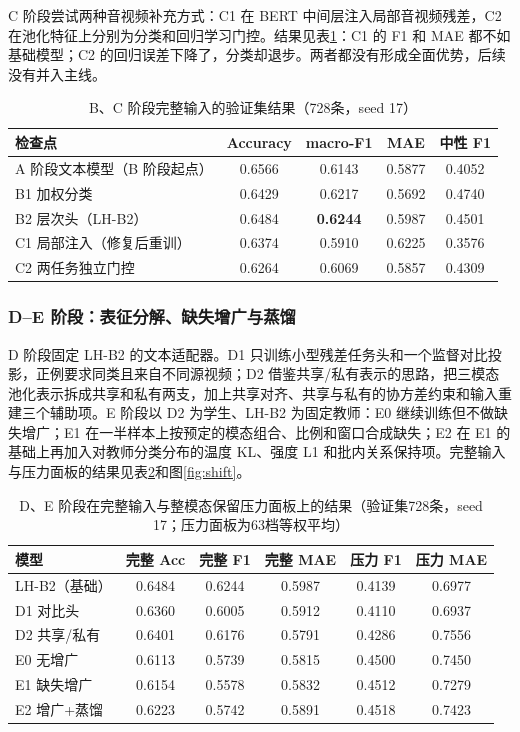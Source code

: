 C 阶段尝试两种音视频补充方式：C1 在 BERT 中间层注入局部音视频残差，C2 在池化特征上分别为分类和回归学习门控。结果见表\ref{tab:stageBC}：C1 的 F1 和 MAE 都不如基础模型；C2 的回归误差下降了，分类却退步。两者都没有形成全面优势，后续没有并入主线。

\begin{table}[htbp]
\centering
\caption{B、C 阶段完整输入的验证集结果（728条，seed 17）}
\label{tab:stageBC}
\begin{tabular}{lcccc}
\toprule
检查点 & Accuracy & macro-F1 & MAE & 中性 F1 \\
\midrule
A 阶段文本模型（B 阶段起点） & 0.6566 & 0.6143 & 0.5877 & 0.4052 \\
B1 加权分类 & 0.6429 & 0.6217 & 0.5692 & 0.4740 \\
B2 层次头（LH-B2） & 0.6484 & \textbf{0.6244} & 0.5987 & 0.4501 \\
C1 局部注入（修复后重训） & 0.6374 & 0.5910 & 0.6225 & 0.3576 \\
C2 两任务独立门控 & 0.6264 & 0.6069 & 0.5857 & 0.4309 \\
\bottomrule
\end{tabular}
\end{table}

\subsubsection{D–E 阶段：表征分解、缺失增广与蒸馏}

D 阶段固定 LH-B2 的文本适配器。D1 只训练小型残差任务头和一个监督对比投影\cite{khosla2020supcon}，正例要求同类且来自不同源视频；D2 借鉴共享/私有表示的思路\cite{hazarika2020misa}，把三模态池化表示拆成共享和私有两支，加上共享对齐、共享与私有的协方差约束和输入重建三个辅助项。E 阶段以 D2 为学生、LH-B2 为固定教师：E0 继续训练但不做缺失增广；E1 在一半样本上按预定的模态组合、比例和窗口合成缺失；E2 在 E1 的基础上再加入对教师分类分布的温度 KL、强度 L1 和批内关系保持项。完整输入与压力面板的结果见表\ref{tab:stageDE}和图\ref{fig:shift}。

\begin{table}[htbp]
\centering
\caption{D、E 阶段在完整输入与整模态保留压力面板上的结果（验证集728条，seed 17；压力面板为63档等权平均）}
\label{tab:stageDE}
\begin{tabular}{lccccc}
\toprule
模型 & 完整 Acc & 完整 F1 & 完整 MAE & 压力 F1 & 压力 MAE \\
\midrule
LH-B2（基础） & 0.6484 & 0.6244 & 0.5987 & 0.4139 & 0.6977 \\
D1 对比头 & 0.6360 & 0.6005 & 0.5912 & 0.4110 & 0.6937 \\
D2 共享/私有 & 0.6401 & 0.6176 & 0.5791 & 0.4286 & 0.7556 \\
E0 无增广 & 0.6113 & 0.5739 & 0.5815 & 0.4500 & 0.7450 \\
E1 缺失增广 & 0.6154 & 0.5578 & 0.5832 & 0.4512 & 0.7279 \\
E2 增广+蒸馏 & 0.6223 & 0.5742 & 0.5891 & 0.4518 & 0.7423 \\
\bottomrule
\end{tabular}
\end{table}

